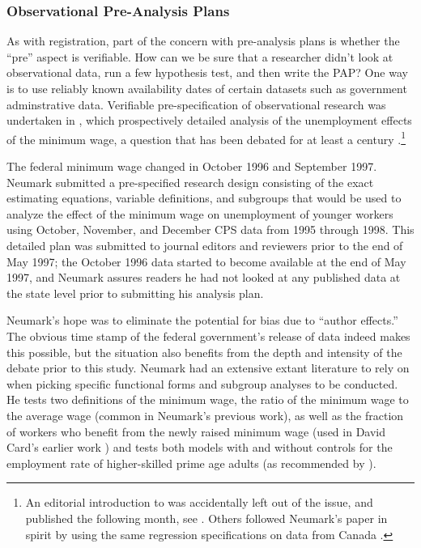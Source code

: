 \documentclass[12pt] {article}
\begin{document}
\subsubsection{Observational Pre-Analysis Plans}
As with registration, part of the concern with pre-analysis plans is whether the ``pre'' aspect is verifiable. How can we be sure that a researcher didn't look at observational data, run a few hypothesis test, and then write the PAP? One way is to use reliably known availability dates of certain datasets such as government adminstrative data. Verifiable pre-specification of observational research was undertaken in \cite{neumark_employment_2001}, which prospectively detailed analysis of the unemployment effects of the minimum wage, a question that has been debated for at least a century \citep{Neumark_2014_bathwater}.\footnote{An editorial introduction to \cite{neumark_employment_2001} was accidentally left out of the issue, and published the following month, see \cite{Levine2001editorial}. Others followed Neumark's paper in spirit by using the same regression specifications on data from Canada \citep{CanadianMinWage2006}.} 

The federal minimum wage changed in October 1996 and September 1997. Neumark submitted a pre-specified research design consisting of the exact estimating equations, variable definitions, and subgroups that would be used to analyze the effect of the minimum wage on unemployment of younger workers using October, November, and December CPS data from 1995 through 1998. This detailed plan was submitted to journal editors and reviewers prior to the end of May 1997; the October 1996 data started to become available at the end of May 1997, and Neumark assures readers he had not looked at any published data at the state level prior to submitting his analysis plan. 

Neumark's hope was to eliminate the potential for bias due to ``author effects.'' The obvious time stamp of the federal government’s release of data indeed makes this possible, but the situation also benefits from the depth and intensity of the debate prior to this study. Neumark had an extensive extant literature to rely on when picking specific functional forms and subgroup analyses to be conducted. He tests two definitions of the minimum wage, the ratio of the minimum wage to the average wage (common in Neumark's previous work), as well as the fraction of workers who benefit from the newly raised minimum wage (used in David Card's earlier work \citep{Card1992minwage}) and tests both models with and without controls for the employment rate of higher-skilled prime age adults (as recommended by \cite{Deere1995minwage}). 
\end{document}
